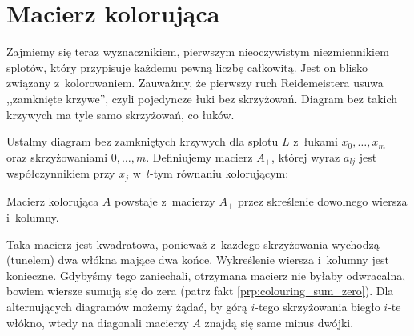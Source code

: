 
\section{Macierz kolorująca}
%
Zajmiemy się teraz wyznacznikiem, pierwszym nieoczywistym niezmiennikiem splotów, który przypisuje każdemu pewną liczbę całkowitą.
Jest on blisko związany z~kolorowaniem.
Zauważmy, że pierwszy ruch Reidemeistera usuwa ,,zamknięte krzywe'', czyli pojedyncze łuki bez skrzyżowań.
Diagram bez takich krzywych ma tyle samo skrzyżowań, co łuków.

\begin{definition}
    Ustalmy diagram bez zamkniętych krzywych dla splotu $L$ z~łukami $x_0, \ldots, x_m$ oraz skrzyżowaniami $0, \ldots, m$.
    Definiujemy macierz $A_+$, której wyraz $a_{lj}$ jest współczynnikiem przy $x_j$ w~$l$-tym równaniu kolorującym:
\begin{comment}
    \[
        \LargePlusCrossingMatrix
    \]
\end{comment}
    Macierz kolorująca $A$ powstaje z~macierzy $A_+$ przez skreślenie dowolnego wiersza i~kolumny.
\end{definition}

Taka macierz jest kwadratowa, ponieważ z~każdego skrzyżowania wychodzą (tunelem) dwa włókna mające dwa końce.
Wykreślenie wiersza i~kolumny jest konieczne.
Gdybyśmy tego zaniechali, otrzymana macierz nie byłaby odwracalna, bowiem wiersze sumują się do zera (patrz fakt \ref{prp:colouring_sum_zero}).
Dla alternujących diagramów możemy żądać, by górą $i$-tego skrzyżowania biegło $i$-te włókno, wtedy na diagonali macierzy $A$ znajdą się same minus dwójki.









